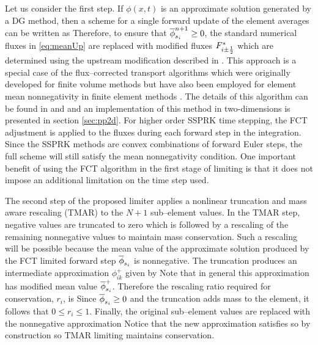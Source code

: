 \documentclass{ametsoc}
\begin{document}
Let us consider the first step. If $\phi(x,t)$ is an approximate solution generated by a DG method, then a scheme for a single forward update of the element averages can be written as
Therefore, to ensure that $\overline{\phi}_{s_i}^{n+1} \geq 0$, the standard numerical fluxes in \eqref{eq:meanUp} are replaced with modified fluxes $F^*_{i\pm\frac{1}{2}}$ which are determined using the upstream modification described in \citet{Smolarkiewicz:1989aa}. This approach is a special case of the flux--corrected transport algorithms which were originally developed for finite volume methods but have also been employed for element mean nonnegativity in finite element methods \citep{Restelli:2006aa,ullrich2014}. The details of this algorithm can be found in \citet{durran2010numerical} and \citet{Smolarkiewicz:1989aa} and an implementation of this method in two-dimensions is presented in section \ref{sec:pp2d}. For higher order SSPRK time stepping, the FCT adjustment is applied to the fluxes during each forward step in the integration. Since the SSPRK methods are convex combinations of forward Euler steps, the full scheme will still satisfy the mean nonnegativity condition. One important benefit of using the FCT algorithm in the first stage of limiting is that it does not impose an additional limitation on the time step used.

The second step of the proposed limiter applies a nonlinear truncation and mass aware rescaling (TMAR) to the $N+1$ sub--element values. In the TMAR step, negative values are truncated to zero which is followed by a rescaling of the remaining nonnegative values to maintain mass conservation. Such a rescaling will be possible because the mean value of the approximate solution produced by the FCT limited forward step $\overline{\phi}_{s_i}$ is nonnegative. The truncation produces an intermediate approximation $\phi_{ik}^+$ given by
Note that in general this approximation has modified mean value $\overline{\phi}_{s_i}^+$. Therefore the rescaling ratio required for conservation, $r_i$, is
Since $\overline{\phi}_{s_i} \geq 0$ and the truncation adds mass to the element, it follows that $0\leq r_i \leq 1$. Finally, the original sub--element values are replaced with the nonnegative approximation
Notice that the new approximation satisfies
so by construction so TMAR limiting maintains conservation.
\end{document}
